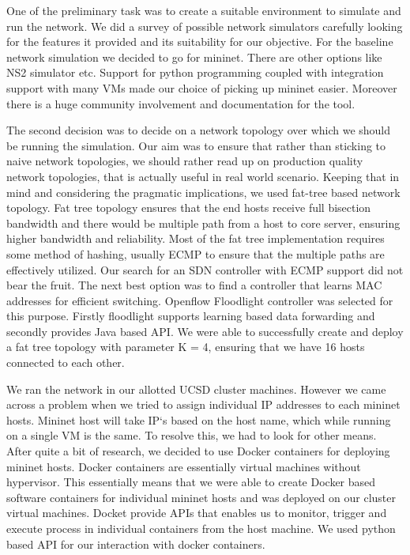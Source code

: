 \documentclass[conference]{IEEEtran}
\begin{document}
One of the preliminary task was to create a suitable environment to simulate and run the network. We did a survey of possible network simulators carefully looking for the features it provided and its suitability for our objective. For the baseline network simulation we decided to go for mininet\cite{Mininet}. There are other options like NS2 simulator etc. Support for python programming coupled with integration support with many VMs made our choice of picking up mininet easier. Moreover there is a huge community involvement and documentation for the tool.

The second decision was to decide on a network topology over which we should be running the simulation. Our aim was to ensure that rather than sticking to naive network topologies, we should rather read up on production quality network topologies, that is actually useful in real world scenario. Keeping that in mind and considering the pragmatic implications, we used fat-tree based network topology. Fat tree topology ensures that the end hosts receive full bisection bandwidth and there would be multiple path from a host to core server, ensuring higher bandwidth and reliability. Most of the fat tree implementation requires some method of hashing, usually ECMP to ensure that the multiple paths are effectively utilized. Our search for an SDN controller with ECMP support did not bear the fruit. The next best option was to find a controller that learns MAC addresses for efficient switching. Openflow Floodlight\cite{Floodlight} controller was selected for this purpose. Firstly floodlight supports learning based data forwarding and secondly provides Java based API. We were able to successfully create and deploy a fat tree topology with parameter K = 4, ensuring that we have 16 hosts connected to each other.

We ran the network in our allotted UCSD cluster machines. However we came across a problem when we tried to assign individual IP addresses to each mininet hosts. Mininet host will take IP`s based on the host name, which while running on a single VM is the same. To resolve this, we had to look for other means. After quite a bit of research, we decided to use Docker\cite{Docker} containers for deploying mininet hosts. Docker containers are essentially virtual machines without hypervisor. This essentially means that we were able to create Docker based software containers for individual mininet hosts and was deployed on our cluster virtual machines. Docket provide APIs that enables us to monitor, trigger and execute process in individual containers from the host machine. We used python based API for our interaction with docker containers.
\end{document}
